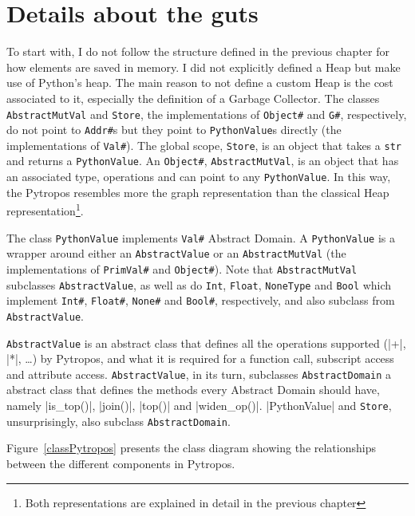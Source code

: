 \section{Details about the guts}

To start with, I do not follow the structure defined in the previous
chapter for how elements are saved in memory. I did not explicitly
defined a Heap but make use of Python's heap. The main reason to not
define a custom Heap is the cost associated to it, especially the
definition of a Garbage Collector. The classes \texttt{AbstractMutVal}
and \texttt{Store}, the implementations of \texttt{Object\#} and
\texttt{G\#}, respectively, do not point to \texttt{Addr\#}s but they
point to \texttt{PythonValue}s directly (the implementations of
\texttt{Val\#}). The global scope, \texttt{Store}, is an object that
takes a \texttt{str} and returns a \texttt{PythonValue}. An
\texttt{Object\#}, \texttt{AbstractMutVal}, is an object that has an
associated type, operations and can point to any \texttt{PythonValue}.
In this way, the Pytropos resembles more the graph representation than
the classical Heap representation\footnote{Both representations are
  explained in detail in the previous chapter}.

The class \texttt{PythonValue} implements \texttt{Val\#} Abstract
Domain. A \texttt{PythonValue} is a wrapper around either an
\texttt{AbstractValue} or an \texttt{AbstractMutVal} (the implementations
of \texttt{PrimVal\#} and \texttt{Object\#}). Note that
\texttt{AbstractMutVal} subclasses \texttt{AbstractValue}, as well as do
\texttt{Int}, \texttt{Float}, \texttt{NoneType} and \texttt{Bool} which
implement \texttt{Int\#}, \texttt{Float\#}, \texttt{None\#} and
\texttt{Bool\#}, respectively, and also subclass from
\texttt{AbstractValue}.

\texttt{AbstractValue} is an abstract class that defines all the
operations supported (\pycode|+|, \pycode|*|, \ldots{}) by Pytropos, and
what it is required for a function call, subscript access and attribute
access. \texttt{AbstractValue}, in its turn, subclasses
\texttt{AbstractDomain} a abstract class that defines the methods every
Abstract Domain should have, namely \pycode|is_top()|, \pycode|join()|,
\pycode|top()| and \pycode|widen_op()|. \pycode|PythonValue| and
\texttt{Store}, unsurprisingly, also subclass \texttt{AbstractDomain}.

Figure~\ref{classPytropos} presents the class diagram showing the relationships
between the different components in Pytropos.

